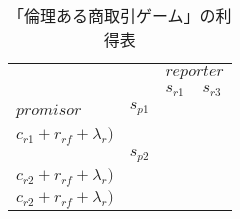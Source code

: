 \newcommand{\SROSinAcc}{ $(c_{p1} + r_{ps} + \epsilon_p,$ \\$ c_{r1} + r_{rs} + \epsilon_r)$ }
\newcommand{\FROSinAcc}{ $(c_{p1} + r_{pf} + \lambda_p,$ \\ $ c_{r1} + r_{rf} + \lambda_r)$ }
\newcommand{\FROFinAcc}{ $(c_{p2} + r_{pf} + \lambda_p,$ \\ $ c_{r2} + r_{rf} + \lambda_r)$ }

\begin{table*}
  \centering
  \begin{tabular}{|l|l|l|l|}
    \hline
    \multicolumn{2}{|l|}{\multirow{2}{*}{}} & \multicolumn{2}{l|}{$reporter$} \\ \cline{3-4}
    \multicolumn{2}{|l|}{}                  &$s_{r1}$&$s_{r3}$\\ \hline
    \multirow{2}{*}{$promisor$}
    &$s_{p1}$&\tabularc{\SROSinAcc}&\tabularc{\FROSinAcc}\\ \cline{2-4}
    &$s_{p2}$&\tabularc{\FROFinAcc}&\tabularc{\FROFinAcc}\\ \hline
  \end{tabular}
  \caption{「倫理ある商取引ゲーム」の利得表}
  \label{ethical-gametable}
\end{table*}